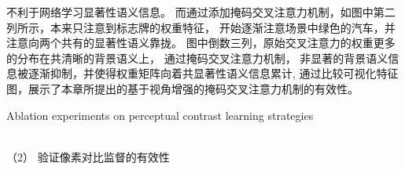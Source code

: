 不利于网络学习显著性语义信息。
而通过添加掩码交叉注意力机制，如图中第二列所示，本来只注意到标志牌的权重特征，
开始逐渐注意场景中绿色的汽车，并注意向两个共有的显著性语义靠拢。
图中倒数三列，原始交叉注意力的权重更多的分布在共清晰的背景语义上，
通过掩码交叉注意力机制，
非显著的背景语义信息被逐渐抑制，并使得权重矩阵向着共显著性语义信息累计,
通过比较可视化特征图，展示了本章所提出的基于视角增强的掩码交叉注意力机制的有效性。
\begin{table}[b]
	{Ablation experiments on perceptual contrast learning strategies}
	\centering
	\label{chpt4:tab:abl_loss}
\end{table}
%
%
\\
%
%
%
%
\indent
（2）
验证像素对比监督的有效性\\
